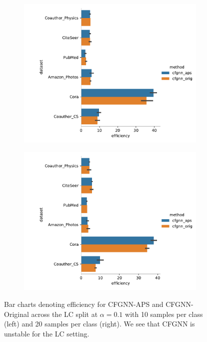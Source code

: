 \begin{figure}
    \centering
    \begin{subfigure}{0.48\linewidth}
        \includegraphics[width=\linewidth]{graphConformal/figures/nspc/cfgnn_aps_vs_orig_efficiency_10}
    \end{subfigure}
    \begin{subfigure}{0.48\linewidth}
        \includegraphics[width=\linewidth]{graphConformal/figures/nspc/cfgnn_aps_vs_orig_efficiency_20}
    \end{subfigure}
    \caption{Bar charts denoting efficiency for CFGNN-APS and CFGNN-Original across the LC split at $\alpha=0.1$ with 10 samples per  class (left) and 20 samples per class (right). We see that CFGNN is unstable for the LC setting.}
    \label{fig:nspc:conformal:cfgnn_aps_vs_orig}
\end{figure}

